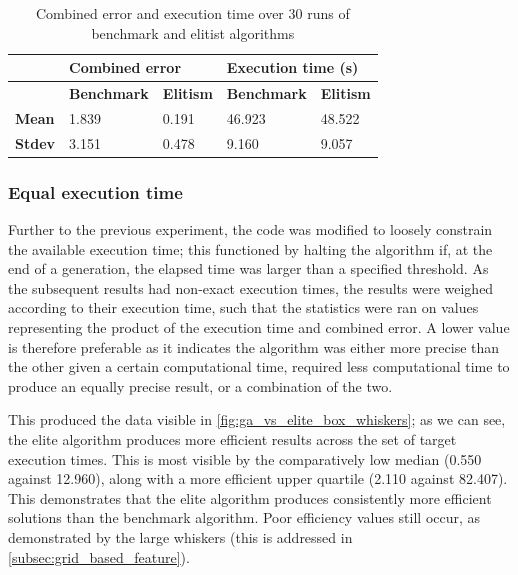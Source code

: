 \documentclass[authoryearcitations]{UoYCSproject}
\begin{document}
\begin{table}[ht]
\centering
\begin{tabular}{|l|l|l|l|l|}
\hline & \multicolumn{2}{l|}{\textbf{Combined error}} & \multicolumn{2}{l|}{\textbf{Execution time (s)}} \\ \hline & 
\textbf{Benchmark} & \textbf{Elitism}& \textbf{Benchmark}   & \textbf{Elitism}  \\ \hline 
\textbf{Mean} & 1.839   & 0.191  & 46.923 & 48.522  \\ \hline
\textbf{Stdev}  & 3.151   & 0.478 & 9.160 & 9.057 \\ \hline
\end{tabular}
\caption[Effects of elitist against tournament selection (table)]{Combined error and execution time over 30 runs of benchmark and elitist algorithms}
\label{tab:ga_vs_elite_eq_pop_gen}
\end{table}

\subsubsection{Equal execution time}
\label{subsec:ga_vs_elite_time_sweep}
Further to the previous experiment, the code was modified to loosely constrain the available execution time; this functioned by halting the algorithm if, at the end of a generation, the elapsed time was larger than a specified threshold. As the subsequent results had non-exact execution times, the results were weighed according to their execution time, such that the statistics were ran on values representing the product of the execution time and combined error. A lower value is therefore preferable as it indicates the algorithm was either more precise than the other given a certain computational time, required less computational time to produce an equally precise result, or a combination of the two. \newline

This produced the data visible in \autoref{fig:ga_vs_elite_box_whiskers}; as we can see, the elite algorithm produces more efficient results across the set of target execution times. This is most visible by the comparatively low median (0.550 against 12.960), along with a more efficient upper quartile (2.110 against 82.407). This demonstrates that the elite algorithm produces consistently more efficient solutions than the benchmark algorithm. Poor efficiency values still occur, as demonstrated by the large whiskers (this is addressed in \autoref{subsec:grid_based_feature}). \newline
\end{document}
